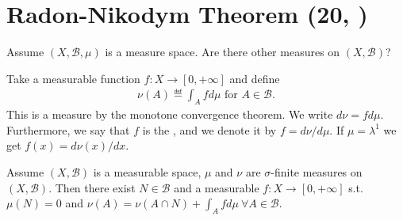 \section{Radon-Nikodym Theorem \tiny{(20, \cite{schilling2017measures})}}
Assume \((X,\mathscr{B}, \mu)\) is a measure space. Are there other measures on \((X,\mathscr{B})\)?
\begin{example}
    Take a measurable function \(f:X\rightarrow [0,+\infty]\) and define
    \begin{align*}
        \nu(A) \eqdef \int_A fd\mu \text{ for } A\in\mathscr{B}.
    \end{align*}
    This is a measure by the monotone convergence theorem. We write \(d\nu = fd\mu\). Furthermore, we say that \(f\) is the 
   , and we denote it by \(f = d\nu/d\mu\). If \(\mu=\lambda^1\) we get
    \(f(x) = d\nu(x)/dx\).
\end{example}
\begin{proposition}
    Assume \((X,\mathscr{B})\) is a measurable space, \(\mu\) and \(\nu\) are \(\sigma\)-finite measures on \((X,\mathscr{B})\). Then there
    exist \(N\in\mathscr{B}\) and a measurable \(f:X\rightarrow[0,+\infty]\) s.t.
    \(\mu(N)=0\) and \(\nu(A)=\nu(A\cap N) + \int_A fd\mu \ \forall A\in\mathscr{B}\). 
\end{proposition}
\ifdetailed 
